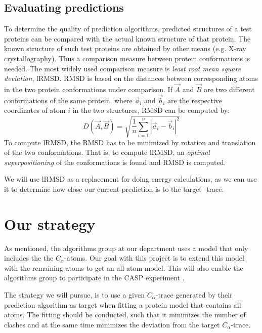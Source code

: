 \subsection{Evaluating predictions}
\label{sec:eval-predictions}
To determine the quality of prediction algorithms, predicted
structures of a test proteins can be compared with the actual known
structure of that protein. The known structure of such test proteins
are obtained by other means (e.g. X-ray crystallography).  Thus a
comparison measure between protein conformations is needed. The most
widely used comparison measure is \textit{least root mean square
  deviation}, lRMSD. RMSD is based on the distances between
corresponding atoms in the two protein conformations under comparison.
If $\vec{A}$ and $\vec{B}$ are two different conformations of the same
protein, where $\vec{a}_i$ and $\vec{b}_i$ are the respective
coordinates of atom $i$ in the two structures, RMSD can be computed
by:
\begin{equation}
  \label{eq:rmsd}
  D(\vec{A}, \vec{B}) = \sqrt{\frac{1}{n}\sum_{i=1}^n |\vec{a}_i - \vec{b}_i|^2}
\end{equation}
To compute lRMSD, the RMSD has to be minimized by rotation and
translation of the two conformations. That is, to compute lRMSD, an
\textit{optimal superpositioning} of the conformations is found and
RMSD is computed.

We will use lRMSD as a replacement for doing energy calculations, as
we can use it to determine how close our current prediction is to the
target \Ca-trace.



\section{Our strategy}
As mentioned, the algorithms group at our department uses a model that
only includes the the $C_\alpha$-atoms. Our goal with this project is
to extend this model with the remaining atoms to get an all-atom
model.  This will also enable the algorithms group to participate in
the CASP experiment \cite{caspwebsite}.

The strategy we will pursue, is to use a given $C_\alpha$-trace
generated by their prediction algorithm as target when fitting a
protein model that contains all atoms. The fitting should be conducted,
such that it minimizes the number of clashes and at the same time
minimizes the deviation from the target $C_\alpha$-trace.

